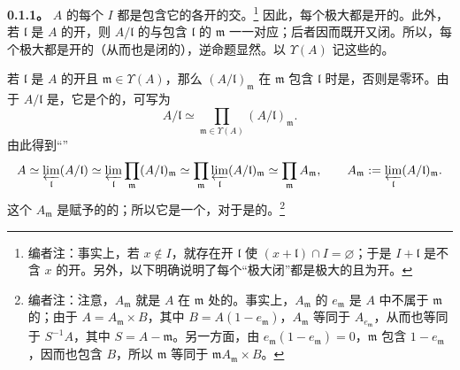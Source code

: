 \textbf{0.1.1。} $A$ 的每个 $I$ 都是包含它的各开的交。\footnote{编者注：事实上，若 $x\notin I$，就存在开 $\mathfrak l$ 使 $(x+\mathfrak l)\cap I=\varnothing$；于是 $I+\mathfrak l$ 是不含 $x$ 的开。另外，以下明确说明了每个“极大闭”都是极大的且为开。} 因此，每个极大都是开的。此外，若 $\mathfrak l$ 是 $A$ 的开，则 $A/\mathfrak l$ 的与包含 $\mathfrak l$ 的 $\mathfrak m$ 一一对应；后者因而既开又闭。所以，每个极大都是开的（从而也是闭的），逆命题显然。以 $\Upsilon(A)$ 记这些的。

若 $\mathfrak l$ 是 $A$ 的开且 $\mathfrak m\in\Upsilon(A)$，那么 $(A/\mathfrak l)_{\mathfrak m}$ 在 $\mathfrak m$ 包含 $\mathfrak l$ 时是，否则是零环。由于 $A/\mathfrak l$ 是，它是个的，可写为
\[
 A/\mathfrak l\simeq\prod_{\mathfrak m\in\Upsilon(A)}(A/\mathfrak l)_{\mathfrak m}.
\]
由此得到“”
\[
 A\simeq\varprojlim_{\mathfrak l}(A/\mathfrak l)
 \simeq\varprojlim_{\mathfrak l}\prod_{\mathfrak m}(A/\mathfrak l)_{\mathfrak m}
 \simeq\prod_{\mathfrak m}\varprojlim_{\mathfrak l}(A/\mathfrak l)_{\mathfrak m}
 \simeq\prod_{\mathfrak m}A_{\mathfrak m},
 \qquad A_{\mathfrak m}:=\varprojlim_{\mathfrak l}(A/\mathfrak l)_{\mathfrak m}.
\]
这个 $A_{\mathfrak m}$ 是赋予的的；所以它是一个，对于是的。\footnote{编者注：注意，$A_{\mathfrak m}$ 就是 $A$ 在 $\mathfrak m$ 处的。事实上，$A_{\mathfrak m}$ 的 $e_{\mathfrak m}$ 是 $A$ 中不属于 $\mathfrak m$ 的；由于 $A=A_{\mathfrak m}\times B$，其中 $B=A(1-e_{\mathfrak m})$，$A_{\mathfrak m}$ 等同于 $A_{e_{\mathfrak m}}$，从而也等同于 $S^{-1}A$，其中 $S=A-\mathfrak m$。另一方面，由 $e_{\mathfrak m}(1-e_{\mathfrak m})=0$，$\mathfrak m$ 包含 $1-e_{\mathfrak m}$，因而也包含 $B$，所以 $\mathfrak m$ 等同于 $\mathfrak mA_{\mathfrak m}\times B$。}

